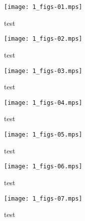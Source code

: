 \documentclass[CJK]{ctexart}
\begin{document}
\begin{figure}[a]
    \centering
    \texttt{[image: 1\_figs-01.mps]}
    \caption{test} \label{fig:1}
\end{figure}

\begin{figure}[b]
    \centering
    \texttt{[image: 1\_figs-02.mps]}
    \caption{test} \label{fig:2}
\end{figure}

\begin{figure}[c]
    \centering
    \texttt{[image: 1\_figs-03.mps]}
    \caption{test} \label{fig:3}
\end{figure}

\begin{figure}[d]
    \centering
    \texttt{[image: 1\_figs-04.mps]}
    \caption{test} \label{fig:4}
\end{figure}

\begin{figure}[e]
    \centering
    \texttt{[image: 1\_figs-05.mps]}
    \caption{test} \label{fig:5}
\end{figure}

\begin{figure}[f]
    \centering
    \texttt{[image: 1\_figs-06.mps]}
    \caption{test} \label{fig:6}
\end{figure}

\begin{figure}[g]
    \centering
    \texttt{[image: 1\_figs-07.mps]}
    \caption{test} \label{fig:7}
\end{figure}
\end{document}

